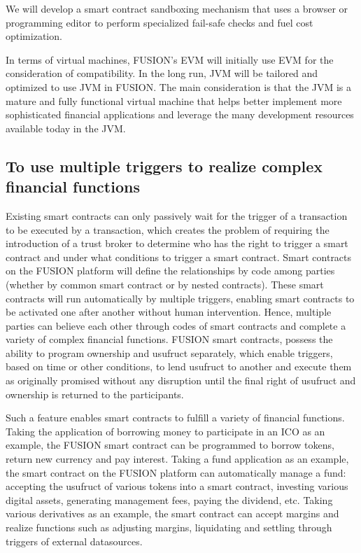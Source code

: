 \documentclass[a4paper,12pt]{article}
\begin{document}
We will develop a smart contract sandboxing mechanism that uses a browser or programming editor to perform specialized fail-safe checks and fuel cost optimization.

In terms of virtual machines, FUSION's EVM will initially use EVM for the consideration of compatibility. In the long run, JVM will be tailored and optimized to use JVM in FUSION. The main consideration is that the JVM is a mature and fully functional virtual machine that helps better implement more sophisticated financial applications and leverage the many development resources available today in the JVM.

\subsection{To use multiple triggers to realize complex financial functions}

Existing smart contracts can only passively wait for the trigger of a transaction to be executed by a transaction, which creates the problem of requiring the introduction of a trust broker to determine who has the right to trigger a smart contract and under what conditions to trigger a smart contract. Smart contracts on the FUSION platform will define the relationships by code among parties (whether by common smart contract or by nested contracts). These smart contracts will run automatically by multiple triggers, enabling smart contracts to be activated one after another without human intervention. Hence, multiple parties can believe each other through codes of smart contracts and complete a variety of complex financial functions. FUSION smart contracts, possess the ability to program ownership and usufruct separately, which enable triggers, based on time or other conditions, to lend usufruct to another and execute them as originally promised without any disruption until the final right of usufruct and ownership is returned to the participants.

Such a feature enables smart contracts to fulfill a variety of financial functions. Taking the application of borrowing money to participate in an ICO as an example, the FUSION smart contract can be programmed to borrow tokens, return new currency and pay interest. Taking a fund application as an example, the smart contract on the FUSION platform can automatically manage a fund: accepting the usufruct of various tokens into a smart contract, investing various digital assets, generating management fees, paying the dividend, etc. Taking various derivatives as an example, the smart contract can accept margins and realize functions such as adjusting margins, liquidating and settling through triggers of external datasources.
\end{document}

